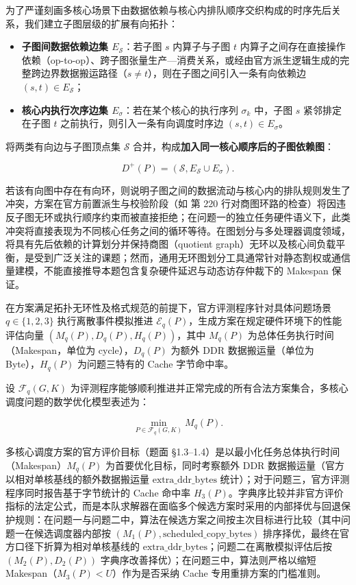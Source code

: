 \documentclass[anonymous,withtoc]{gmcm2026}
\providecommand{\tightlist}{\setlength{\itemsep}{0pt}\setlength{\parskip}{0pt}}
\begin{document}
为了严谨刻画多核心场景下由数据依赖与核心内排队顺序交织构成的时序先后关系，我们建立子图层级的扩展有向拓扑：

\begin{itemize}
\tightlist
\item
  \textbf{子图间数据依赖边集 \(E_{\mathcal{S}}\)}：若子图 \(s\) 内算子与子图 \(t\) 内算子之间存在直接操作依赖（op-to-op）、跨子图张量生产---消费关系，或经由官方派生逻辑生成的完整跨边界数据搬运路径（\(s \ne t\)），则在子图之间引入一条有向依赖边 \((s, t) \in E_{\mathcal{S}}\)；
\item
  \textbf{核心内执行次序边集 \(E_\sigma\)}：若在某个核心的执行序列 \(\sigma_k\) 中，子图 \(s\) 紧邻排定在子图 \(t\) 之前执行，则引入一条有向调度时序边 \((s, t) \in E_\sigma\)。
\end{itemize}

将两类有向边与子图顶点集 \(\mathcal{S}\) 合并，构成\textbf{加入同一核心顺序后的子图依赖图}：

\begin{equation}
D^+(P) = (\mathcal{S}, E_{\mathcal{S}} \cup E_\sigma).
\end{equation}

若该有向图中存在有向环，则说明子图之间的数据流动与核心内的排队规则发生了冲突，方案在官方前置派生与校验阶段（如 \texttt{} 第 220 行对商图环路的检查）将因违反子图无环或执行顺序约束而被直接拒绝；在问题一的独立任务硬件语义下，此类冲突将直接表现为不同核心任务之间的循环等待。在图划分与多处理器调度领域，将具有先后依赖的计算划分并保持商图（quotient graph）无环以及核心间负载平衡，是受到广泛关注的课题\cite{ref6}；然而，通用无环图划分工具通常针对静态割权或通信量建模，不能直接推导本题包含复杂硬件延迟与动态访存仲裁下的 Makespan 保证。

在方案满足拓扑无环性及格式规范的前提下，官方评测程序针对具体问题场景 \(q \in \{1, 2, 3\}\) 执行离散事件模拟推进 \(\mathcal{E}_q(P)\)，生成方案在规定硬件环境下的性能评估向量 \((M_q(P), D_q(P), H_q(P))\)，其中 \(M_q(P)\) 为总体任务执行时间（Makespan，单位为 cycle），\(D_q(P)\) 为额外 DDR 数据搬运量（单位为 Byte），\(H_q(P)\) 为问题三特有的 Cache 字节命中率。

设 \(\mathcal{F}_q(G, K)\) 为评测程序能够顺利推进并正常完成的所有合法方案集合，多核心调度问题的数学优化模型表述为：

\begin{equation}
\min_{P \in \mathcal{F}_q(G, K)} M_q(P).
\end{equation}

多核心调度方案的官方评价目标（题面 §1.3--1.4）是以最小化任务总体执行时间（Makespan）\(M_q(P)\) 为首要优化目标，同时考察额外 DDR 数据搬运量（官方以相对单核基线的额外数据搬运量 \(\text{extra\_ddr\_bytes}\) 统计）；对于问题三，官方评测程序同时报告基于字节统计的 Cache 命中率 \(H_3(P)\)。字典序比较并非官方评价指标的法定公式，而是本队求解器在面临多个候选方案时采用的内部择优与回退保护规则：在问题一与问题二中，算法在候选方案之间按主次目标进行比较（其中问题一在候选调度器内部按 \((M_1(P), \text{scheduled\_copy\_bytes})\) 排序择优，最终在官方口径下折算为相对单核基线的 \(\text{extra\_ddr\_bytes}\)；问题二在离散模拟评估后按 \((M_2(P), D_2(P))\) 字典序改善择优）；在问题三中，算法则严格以缩短 Makespan（\(M_3(P) < U\)）作为是否采纳 Cache 专用重排方案的门槛准则。
\end{document}
